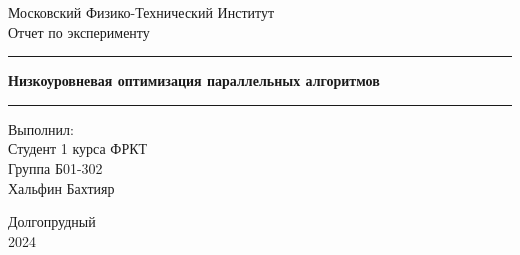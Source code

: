 \begin{titlepage}

    \begin{center}
        \vspace*{5cm}
        \Huge Московский Физико-Технический Институт
        \vspace*{2cm}\\
        \LARGE Отчет по эксперименту
        \\\vspace*{0.25cm}

        \noindent\rule{\textwidth}{1pt}
        \vspace*{-0.25cm}

        \huge \textbf{Низкоуровневая оптимизация параллельных алгоритмов}
        \noindent\rule{\textwidth}{1pt}


       \vfill
        \begin{flushright}
            \begin{minipage}{.4\textwidth}
            \Large Выполнил:\\ Студент 1 курса ФРКТ\\ Группа Б01-302 \\Хальфин Бахтияр\\
            \end{minipage}
        \end{flushright}

        \vfill
        \normalsize Долгопрудный \\2024

    \end{center}
\end{titlepage}
\restoregeometry
